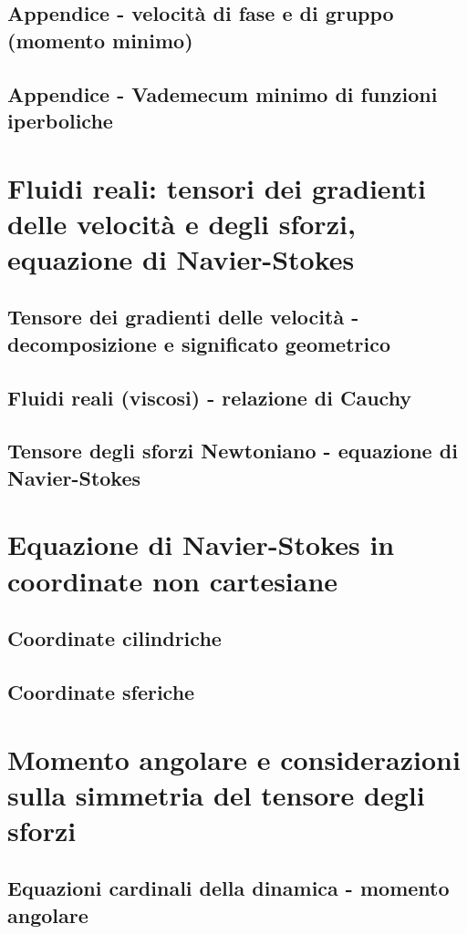 \documentclass[a4paper,11pt]{report}
\begin{document}
	\section{Appendice - velocità di fase e di gruppo (momento minimo)}
	\section{Appendice - Vademecum minimo di funzioni iperboliche}

\chapter{Fluidi reali: tensori dei gradienti delle velocità e degli sforzi, equazione di Navier-Stokes}

	\section{Tensore dei gradienti delle velocità - decomposizione e significato geometrico}
	\section{Fluidi reali (viscosi) - relazione di Cauchy}
	\section{Tensore degli sforzi Newtoniano - equazione di Navier-Stokes}


\chapter{Equazione di Navier-Stokes in coordinate non cartesiane}

	\section{Coordinate cilindriche}
	\section{Coordinate sferiche}


\chapter{Momento angolare e considerazioni sulla simmetria del tensore degli sforzi}

	\section{Equazioni cardinali della dinamica - momento angolare}
\end{document}
